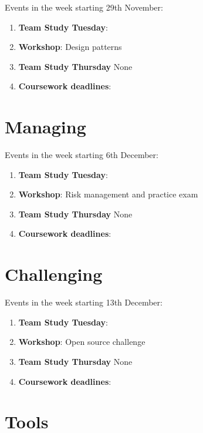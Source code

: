 \documentclass[
]{book}
\providecommand{\tightlist}{%
  \setlength{\itemsep}{0pt}\setlength{\parskip}{0pt}}
\begin{document}
Events in the week starting 29th November:

\begin{enumerate}
\def\labelenumi{\arabic{enumi}.}
\tightlist
\item
  \textbf{Team Study Tuesday}:
\item
  \textbf{Workshop}: Design patterns
\item
  \textbf{Team Study Thursday} None
\item
  \textbf{Coursework deadlines}:
\end{enumerate}

\hypertarget{week11}{%
\section{Managing}\label{week11}}

Events in the week starting 6th December:

\begin{enumerate}
\def\labelenumi{\arabic{enumi}.}
\tightlist
\item
  \textbf{Team Study Tuesday}:
\item
  \textbf{Workshop}: Risk management and practice exam
\item
  \textbf{Team Study Thursday} None
\item
  \textbf{Coursework deadlines}:
\end{enumerate}

\hypertarget{week12}{%
\section{Challenging}\label{week12}}

Events in the week starting 13th December:

\begin{enumerate}
\def\labelenumi{\arabic{enumi}.}
\tightlist
\item
  \textbf{Team Study Tuesday}:
\item
  \textbf{Workshop}: Open source challenge
\item
  \textbf{Team Study Thursday} None
\item
  \textbf{Coursework deadlines}:
\end{enumerate}

\hypertarget{tooling}{%
\section{Tools}\label{tooling}}
\end{document}
